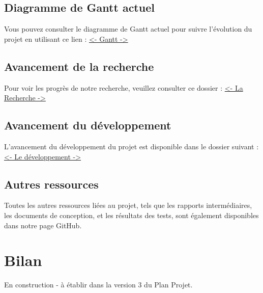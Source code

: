 \documentclass[11pt]{rapport_class}
\begin{document}
\section{Diagramme de Gantt actuel}
\qquad Vous pouvez consulter le diagramme de Gantt actuel pour suivre l'évolution du projet en utilisant ce lien :
\href{https://github.com/fghjklm/Projet_M1_CheckThat-/tree/main/gantt}{<- Gantt ->}

\section{Avancement de la recherche}
\qquad Pour voir les progrès de notre recherche, veuillez consulter ce dossier :
\href{https://github.com/fghjklm/Projet_M1_CheckThat-/tree/main/articles}{<- La Recherche ->}

\section{Avancement du développement}
\qquad L'avancement du développement du projet est disponible dans le dossier suivant :
\href{https://github.com/fghjklm/Projet_M1_CheckThat-/tree/main/code}{<- Le développement ->}

\section{Autres ressources}
\qquad Toutes les autres ressources liées au projet, tels que les rapports intermédiaires, les documents de conception, et les résultats des tests, sont également disponibles dans notre page GitHub.


\chapter{\quad Bilan}
\centerline{En construction - à établir dans la version 3 du Plan Projet.}
\end{document}
